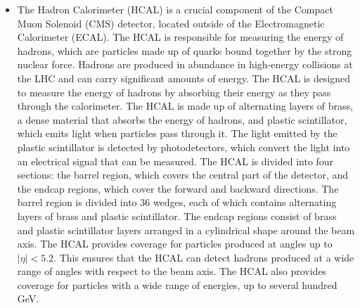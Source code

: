 \begin{itemize}
\item The Hadron Calorimeter (HCAL) is a crucial component of the Compact Muon Solenoid (CMS) detector, located outside of the Electromagnetic Calorimeter (ECAL). The HCAL is responsible for measuring the energy of hadrons, which are particles made up of quarks bound together by the strong nuclear force. Hadrons are produced in abundance in high-energy collisions at the LHC and can carry significant amounts of energy. The HCAL is designed to measure the energy of hadrons by absorbing their energy as they pass through the calorimeter. The HCAL is made up of alternating layers of brass, a dense material that absorbs the energy of hadrons, and plastic scintillator, which emits light when particles pass through it. The light emitted by the plastic scintillator is detected by photodetectors, which convert the light into an electrical signal that can be measured. The HCAL is divided into four sections: the barrel region, which covers the central part of the detector, and the endcap regions, which cover the forward and backward directions. The barrel region is divided into 36 wedges, each of which contains alternating layers of brass and plastic scintillator. The endcap regions consist of brass and plastic scintillator layers arranged in a cylindrical shape around the beam axis. The HCAL provides coverage for particles produced at angles up to $|\eta| < 5.2$. This ensures that the HCAL can detect hadrons produced at a wide range of angles with respect to the beam axis. The HCAL also provides coverage for particles with a wide range of energies, up to several hundred GeV.





\end{itemize}
